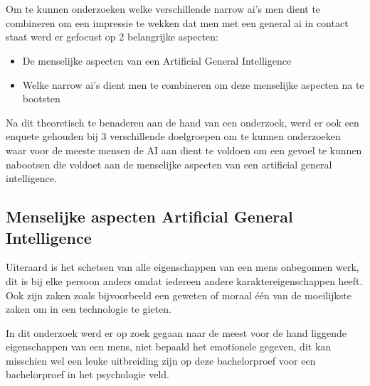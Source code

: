 
\chapter{}
\label{ch:methodologie}


Om te kunnen onderzoeken welke verschillende narrow ai's men dient te combineren om een impressie te wekken dat men met een general ai in contact staat werd er gefocust op 2 belangrijke aspecten:

\begin{itemize}
    \item De menselijke aspecten van een Artificial General Intelligence
    \item Welke narrow ai's dient men te combineren om deze menselijke aspecten na te bootsten
\end{itemize}

Na dit theoretisch te benaderen aan de hand van een onderzoek, werd er ook een enquete gehouden bij 3 verschillende doelgroepen om te kunnen onderzoeken waar voor de meeste mensen de AI aan dient te voldoen om een gevoel te kunnen nabootsen die voldoet aan de menselijke aspecten van een artificial general intelligence.

\newpage

\section{Menselijke aspecten Artificial General Intelligence}

Uiteraard is het schetsen van alle eigenschappen van een mens onbegonnen werk, dit is bij elke persoon anders omdat iedereen andere karaktereigenschappen heeft. Ook zijn zaken zoals bijvoorbeeld een geweten of moraal één van de moeilijkste zaken om in een technologie te gieten. 

In dit onderzoek werd er op zoek gegaan naar de meest voor de hand liggende eigenschappen van een mens, niet bepaald het emotionele gegeven, dit kan misschien wel een leuke uitbreiding zijn op deze bachelorproef voor een bachelorproef in het psychologie veld.

